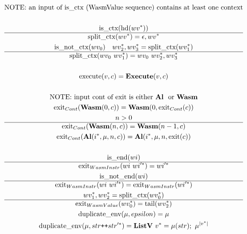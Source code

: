 \begin{gather*}
\text{NOTE: an input of is\_ctx (WasmValue sequence) contains at least one context} \\
%
\newline \\
  \text{is\_ctx}(\text{hd}(\seq{wv})) \\
  \hline
  \splitctx(\seq{wv}) = \epsilon, \seq{wv} \\
%
  \text{is\_not\_ctx}(wv_0) \quad \seq{wv_2}, \seq{wv_3} = \splitctx(\seq{wv_1}) \\
  \hline
  \splitctx(wv_0 ~ \seq{wv_1}) = wv_0 ~ \seq{wv_2}, \seq{wv_3} \\
%
\newline \\
  \execute(v, c) = \exe(v, c) \\
%
\newline \\
\text{NOTE: input cont of exit is either \al ~ or \wasm} \\
  \exit_{Cont}(\wasm (0, c)) = \wasm(0, \exit_{Cont}(c)) \\
%
  n > 0 \\
  \hline
  \exit_{Cont}(\wasm (n, c)) = \wasm(n-1, c) \\
%
  \exit_{Cont}(\al (\seq i, \mu, n, c)) = \al (\seq i, \mu, n, \exit(c)) \\
%
\newline \\
  \text{is\_end}(wi) \\
  \hline
  \exit_{WasmInstr}(wi ~ \seq{wi'}) = \seq{wi'} \\
%
  \text{is\_not\_end}(wi) \\
  \hline
  \exit_{WasmInstr}(wi ~ \seq{wi'}) = \exit_{WasmInstr}(\seq{wi'}) \\
%
  \seq{wv_1}, \seq{wv_2} = \splitctx(\seq{wv_0}) \\
  \hline
  \exit_{WasmValue}(\seq{wv_0}) = \text{tail}(\seq{wv_2}) \\
%
  \duplicateenv(\mu, epsilon) = \mu \\
  \duplicateenv(\mu, str \cat \seq{str'}) = \listv ~ \seq v = \mu(str); ~ \mu^{|\seq v|}
\end{gather*}





